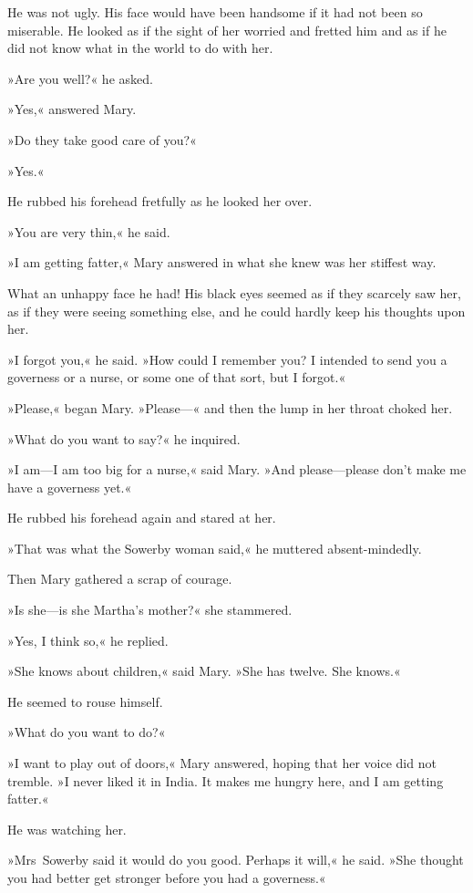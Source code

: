 He was not ugly. His face would have been handsome if it had not been so miserable. He looked as if the sight of her worried and fretted him and as if he did not know what in the world to do with her.

»Are you well?« he asked.

»Yes,« answered Mary.

»Do they take good care of you?«

»Yes.«

He rubbed his forehead fretfully as he looked her over.

»You are very thin,« he said.

»I am getting fatter,« Mary answered in what she knew was her stiffest way.

What an unhappy face he had! His black eyes seemed as if they scarcely saw her, as if they were seeing something else, and he could hardly keep his thoughts upon her.

»I forgot you,« he said. »How could I remember you? I intended to send you a governess or a nurse, or some one of that sort, but I forgot.«

»Please,« began Mary. »Please—« and then the lump in her throat choked her.

»What do you want to say?« he inquired.

»I am—I am too big for a nurse,« said Mary. »And please—please don't make me have a governess yet.«

He rubbed his forehead again and stared at her.

»That was what the Sowerby woman said,« he muttered absent-mindedly.

Then Mary gathered a scrap of courage.

»Is she—is she Martha's mother?« she stammered.

»Yes, I think so,« he replied.

»She knows about children,« said Mary. »She has twelve. She knows.«

He seemed to rouse himself.

»What do you want to do?«

»I want to play out of doors,« Mary answered, hoping that her voice did not tremble. »I never liked it in India. It makes me hungry here, and I am getting fatter.«

He was watching her.

»Mrs~Sowerby said it would do you good. Perhaps it will,« he said. »She thought you had better get stronger before you had a governess.«

